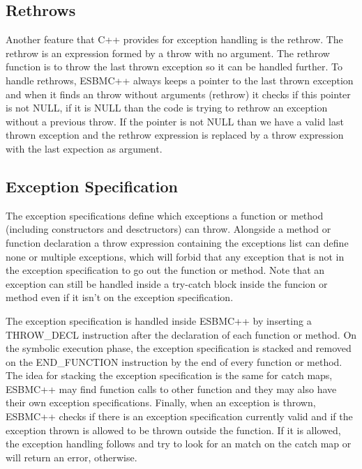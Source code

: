 \documentclass[a4paper]{llncs}
\begin{document}
\subsection{Rethrows}

Another feature that C++ provides for exception handling is the rethrow. The rethrow is an expression formed by
a throw with no argument. The rethrow function is to throw the last thrown exception so it can be handled further. To handle rethrows,
ESBMC++ always keeps a pointer to the last thrown exception and when it finds an throw without arguments (rethrow) it checks if this pointer
is not NULL, if it is NULL than the code is trying to rethrow an exception without a previous throw. If the pointer is not NULL than we have
a valid last thrown exception and the rethrow expression is replaced by a throw expression with the last expection as argument.

\subsection{Exception Specification}

The exception specifications define which exceptions a function or method (including constructors
and desctructors) can throw. Alongside a method or function declaration a throw expression containing the exceptions list can define none or
multiple exceptions, which will forbid that any exception that is not in the exception specification to go out the function or method. Note
that an exception can still be handled inside a try-catch block inside the funcion or method even if it isn't on the exception specification.

The exception specification is handled inside ESBMC++ by inserting a THROW\_DECL instruction after the declaration of each function or method.
On the symbolic execution phase, the exception specification is stacked and removed on the END\_FUNCTION instruction by the end of every
function or method. The idea for stacking the exception specification is the same for catch maps, ESBMC++ may find function calls to other
function and they may also have their own exception specifications. Finally, when an exception is thrown, ESBMC++ checks if there is an
exception specification currently valid and if the exception thrown is allowed to be thrown outside the function. If it is allowed, the
exception handling follows and try to look for an match on the catch map or will return an error, otherwise.
\end{document}
